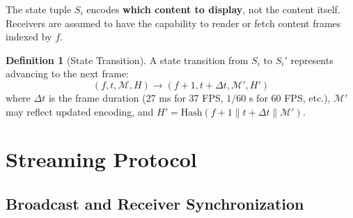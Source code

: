 \documentclass[twocolumn,10pt,a4paper]{article}
\theoremstyle{plain}
\theoremstyle{definition}
\newtheorem{definition}[theorem]{Definition}
\begin{document}
The state tuple $S_i$ encodes \textbf{which content to display}, not the content itself. Receivers are assumed to have the capability to render or fetch content frames indexed by $f$.

\begin{definition}[State Transition]
A state transition from $S_i$ to $S_i'$ represents advancing to the next frame:
\[
(f, t, \mathcal{M}, H) \to (f+1, t + \Delta t, \mathcal{M}', H')
\]
where $\Delta t$ is the frame duration (27 ms for 37 FPS, $1/60$ s for 60 FPS, etc.), $\mathcal{M}'$ may reflect updated encoding, and $H' = \mathrm{Hash}(f+1 \| t + \Delta t \| \mathcal{M}')$.
\end{definition}

\section{Streaming Protocol}
\label{sec:protocol}

\subsection{Broadcast and Receiver Synchronization}
\end{document}
